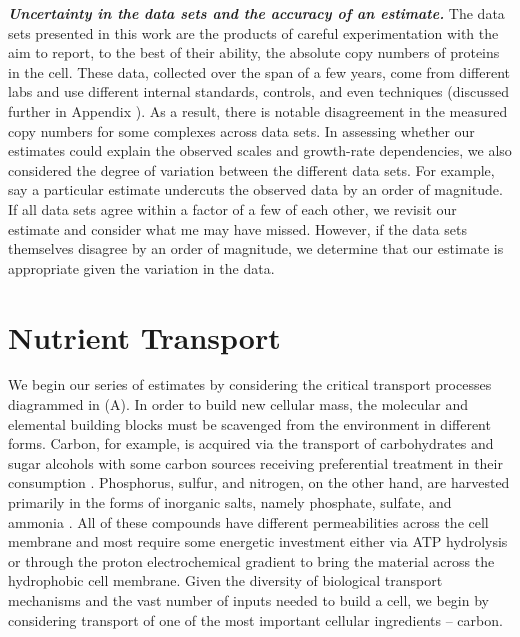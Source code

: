 \begin{featurebox}
\textbf{\itshape Uncertainty in the data sets and the accuracy of an estimate.}
The data sets presented in this work are the products of
careful experimentation with the aim to report, to the best of their ability,
the absolute copy numbers of proteins in the cell. These data, collected over
the span of a few years, come from different labs and use different internal
standards, controls, and even techniques (discussed further in Appendix ).
As a result, there is notable disagreement in the measured copy numbers for
some complexes across data sets. In assessing whether our estimates could explain the
observed scales and growth-rate dependencies, we also considered the degree of
variation between the different data sets. For example, say a particular
estimate undercuts the observed data by an order of magnitude. If all data sets
agree within a factor of a few of each other, we revisit our estimate and
consider what me may have missed. However, if the data sets themselves disagree
by an order of magnitude, we determine that our estimate is
appropriate given the variation in the data.
\label{box:estimate_rules}
\end{featurebox}


\section{Nutrient Transport}
We begin our series of estimates by considering the critical transport
processes diagrammed in (A). In order to build new cellular
mass, the molecular and elemental building blocks must be scavenged from the
environment in different forms. Carbon, for example, is acquired via the
transport of carbohydrates and sugar alcohols with some carbon sources
receiving preferential treatment in their consumption \citep{monod1947}.
Phosphorus, sulfur, and nitrogen, on the other hand, are harvested primarily
in the forms of inorganic salts, namely phosphate, sulfate, and ammonia
\citep{jun2018, assentoft2016, stasi2019, antonenko1997, rosenberg1977,
willsky1973}. All of these compounds have different permeabilities across the
cell membrane \cite{phillips2018} and most require some energetic investment
either via ATP hydrolysis or through the proton electrochemical gradient to
bring the material across the hydrophobic cell membrane. Given the diversity
of biological transport mechanisms and the vast number of inputs needed to
build a cell, we begin by considering transport of one of the most important
cellular ingredients -- carbon.

